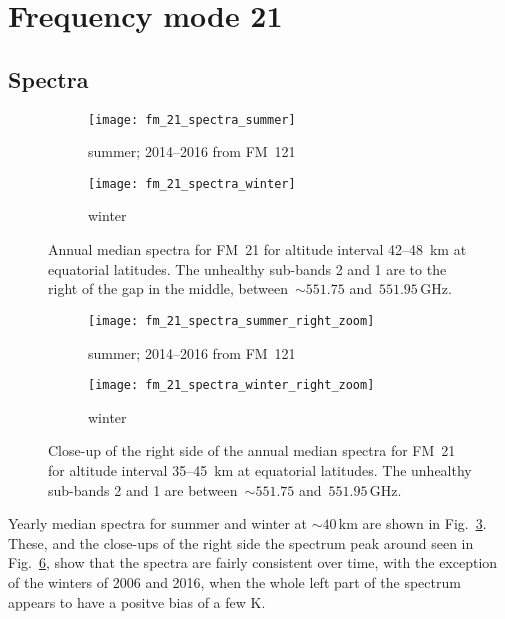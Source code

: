\section{Frequency mode 21}
\label{FM21}

\subsection{Spectra}
\label{FM21:spectra}

\begin{figure}[ht]
    \centering
    \begin{subfigure}[b]{0.9545\textwidth}
        \texttt{[image: fm\_21\_spectra\_summer]}
        \caption{summer; 2014--2016 from FM~121}\label{fig:spectra:21:summer}
    \end{subfigure}
    \begin{subfigure}[b]{0.9545\textwidth}
        \texttt{[image: fm\_21\_spectra\_winter]}
        \caption{winter}\label{fig:spectra:21:winter}
    \end{subfigure}
    \caption{Annual median spectra for FM~21 for altitude interval 42--48~km at
        equatorial latitudes. The unhealthy sub-bands 2 and 1 are to the right
        of the gap in the middle, between~$\sim551.75$
        and~$551.95\,\mathrm{GHz}$.
        }\label{fig:spectra:21}
\end{figure}

\begin{figure}[ht]
    \centering
    \begin{subfigure}[b]{0.9545\textwidth}
        \texttt{[image: fm\_21\_spectra\_summer\_right\_zoom]}
        \caption{summer; 2014--2016 from
            FM~121}\label{fig:spectra:21:summer:closeup}
    \end{subfigure}
    \begin{subfigure}[b]{0.9545\textwidth}
        \texttt{[image: fm\_21\_spectra\_winter\_right\_zoom]}
        \caption{winter}\label{fig:spectra:21:winter:closeup}
    \end{subfigure}
    \caption{Close-up of the right side of the annual median spectra for
        FM~21 for altitude interval 35--45~km at equatorial latitudes.  The
        unhealthy sub-bands 2 and 1 are between~$\sim551.75$
        and~$551.95\,\mathrm{GHz}$.
        }\label{fig:spectra:21:closeup}
\end{figure}

\noindent
Yearly median spectra for summer and winter at $\sim40\,\mathrm{km}$ are shown
in Fig.~\ref{fig:spectra:21}.  These, and the close-ups of the right side the
spectrum peak around seen in Fig.~\ref{fig:spectra:21:closeup}, show that the
spectra are fairly consistent over time, with the exception of the winters of
2006 and 2016, when the whole left part of the spectrum appears to have a
positve bias of a few $\mathrm{K}$.

